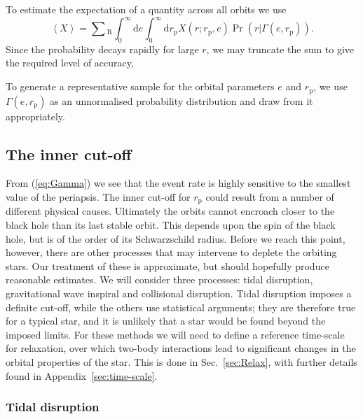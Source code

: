 \documentclass[useAMS,usedcolumn,usegraphicx,usenatbib]{mn2e}
\newcommand{\eqnref}[1]{(\ref{eq:#1})}
\newcommand{\secref}[1]{Sec.~\ref{sec:#1}}
\newcommand{\apref}[1]{Appendix~\ref{sec:#1}}
\newcommand{\sub}[1]{\ensuremath{_\mathrm{#1}}}
\newcommand{\dd}{\ensuremath{\mathrm{d}}}
\begin{document}
To estimate the expectation of a quantity across all orbits we use
\begin{equation}
\left\langle X\right\rangle = \sum\sub{R} \int_0^\infty \dd e \int_0^\infty \dd r\sub{p} X(r;r\sub{p},e)\Pr(r|\Gamma(e, r\sub{p})).
\end{equation}
Since the probability decays rapidly for large $r$, we may truncate the sum to give the required level of accuracy,

To generate a representative sample for the orbital parameters $e$ and $r\sub{p}$, we use $\Gamma(e, r\sub{p})$ as an unnormalised probability distribution and draw from it appropriately.

\subsection{The inner cut-off}

From \eqnref{Gamma} we see that the event rate is highly sensitive to the smallest value of the periapsis. The inner cut-off for $r\sub{p}$ could result from a number of different physical causes. Ultimately the orbits cannot encroach closer to the black hole than its last stable orbit. This depends upon the spin of the black hole, but is of the order of its Schwarzschild radius. Before we reach this point, however, there are other processes that may intervene to deplete the orbiting stars. Our treatment of these is approximate, but should hopefully produce reasonable estimates. We will consider three processes: tidal disruption, gravitational wave inspiral and collisional disruption. Tidal disruption imposes a definite cut-off, while the others use statistical arguments; they are therefore true for a typical star, and it is unlikely that a star would be found beyond the imposed limits. For these methods we will need to define a reference time-scale for relaxation, over which two-body interactions lead to significant changes in the orbital properties of the star. This is done in \secref{Relax}, with further details found in \apref{time-scale}.

\subsubsection{Tidal disruption}
\end{document}
